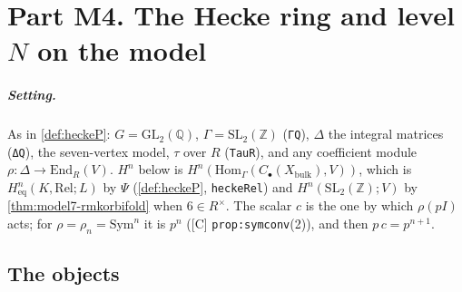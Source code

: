 \chapter{Part M4. The Hecke ring and level \texorpdfstring{$N$}{N} on the model}\label{ch:m4}

\paragraph{Setting.} As in \ref{def:heckeP}: $G=\mathrm{GL}_2(\mathbb Q)$, $\Gamma=\mathrm{SL}_2(\mathbb Z)$ (\texttt{ΓQ}), $\Delta$ the
integral matrices (\texttt{ΔQ}), the seven-vertex model, $\tau$ over $R$ (\texttt{TauR}), and any coefficient module
$\rho\colon\Delta\to\mathrm{End}_R(V)$. $H^n$ below is $H^n(\mathrm{Hom}_\Gamma(C_\bullet(X_{\mathrm{bulk}}),V))$, which is
$H^n_{\mathrm{eq}}(K,\mathrm{Rel};L)$ by $\Psi$ (\ref{def:heckeP}, \texttt{heckeRel}) and $H^n(\mathrm{SL}_2(\mathbb Z);V)$ by
\ref{thm:model7-rmkorbifold} when $6\in R^\times$. The scalar $c$ is the one by which $\rho(pI)$ acts; for
$\rho=\rho_n=\mathrm{Sym}^n$ it is $p^n$ ([C] \texttt{prop:symconv}(2)), and then $p\,c=p^{n+1}$.

\section{The objects}

